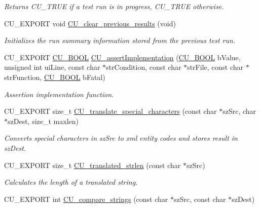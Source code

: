\begin{DoxyCompactItemize}
\begin{DoxyCompactList}\small\item\em Returns {\ttfamily C\-U\-\_\-\-T\-R\-U\-E} if a test run is in progress, {\ttfamily C\-U\-\_\-\-T\-R\-U\-E} otherwise. \end{DoxyCompactList}\item 
C\-U\-\_\-\-E\-X\-P\-O\-R\-T void \hyperlink{group__Framework_ga7c9c2263c915119ce0e5b835b2a30c07}{C\-U\-\_\-clear\-\_\-previous\-\_\-results} (void)
\begin{DoxyCompactList}\small\item\em Initializes the run summary information stored from the previous test run. \end{DoxyCompactList}\item 
C\-U\-\_\-\-E\-X\-P\-O\-R\-T \hyperlink{group__Framework_gabd98d449e979a6379b06551242106dd4}{C\-U\-\_\-\-B\-O\-O\-L} \hyperlink{group__Framework_ga31a858e8b496b2af992b63902064c5fa}{C\-U\-\_\-assert\-Implementation} (\hyperlink{group__Framework_gabd98d449e979a6379b06551242106dd4}{C\-U\-\_\-\-B\-O\-O\-L} b\-Value, unsigned int ui\-Line, const char $\ast$str\-Condition, const char $\ast$str\-File, const char $\ast$str\-Function, \hyperlink{group__Framework_gabd98d449e979a6379b06551242106dd4}{C\-U\-\_\-\-B\-O\-O\-L} b\-Fatal)
\begin{DoxyCompactList}\small\item\em Assertion implementation function. \end{DoxyCompactList}\item 
C\-U\-\_\-\-E\-X\-P\-O\-R\-T size\-\_\-t \hyperlink{group__Framework_ga24f4ea5ebafd70276bdc1bcdf1b89393}{C\-U\-\_\-translate\-\_\-special\-\_\-characters} (const char $\ast$sz\-Src, char $\ast$sz\-Dest, size\-\_\-t maxlen)
\begin{DoxyCompactList}\small\item\em Converts special characters in sz\-Src to xml entity codes and stores result in sz\-Dest. \end{DoxyCompactList}\item 
C\-U\-\_\-\-E\-X\-P\-O\-R\-T size\-\_\-t \hyperlink{group__Framework_gaed0d90c9fdd0c46b6043fb2b8ae570f4}{C\-U\-\_\-translated\-\_\-strlen} (const char $\ast$sz\-Src)
\begin{DoxyCompactList}\small\item\em Calculates the length of a translated string. \end{DoxyCompactList}\item 
C\-U\-\_\-\-E\-X\-P\-O\-R\-T int \hyperlink{group__Framework_gab88ddd1b0e508bf6210808d34285659e}{C\-U\-\_\-compare\-\_\-strings} (const char $\ast$sz\-Src, const char $\ast$sz\-Dest)

\end{DoxyCompactItemize}
